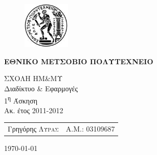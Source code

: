 \begin{titlepage}
\begin{center}
\begin{figure}[h] 
     \includegraphics[width=0.2\textwidth]{title/ntua_logo}
\end{figure}
\vspace{1cm}
\begin{LARGE}\textbf{ΕΘΝΙΚΟ ΜΕΤΣΟΒΙΟ ΠΟΛΥΤΕΧΝΕΙΟ\\[1.5cm]}\end{LARGE}
\begin{Large}
ΣΧΟΛΗ ΗΜ\&ΜΥ\\
Διαδίκτυο \& Εφαρμογές\\[2cm]
1\textsuperscript{η} Άσκηση\\
Ακ. έτος 2011-2012\\
\end{Large}
\vfill
\begin{flushright}
\begin{tabular}{l r}
{Γρηγόρης \textsc{Λύρας}}&
{Α.Μ.: 03109687}\\
\end{tabular}
\end{flushright}

\large\today\\
\end{center}
\end{titlepage}


